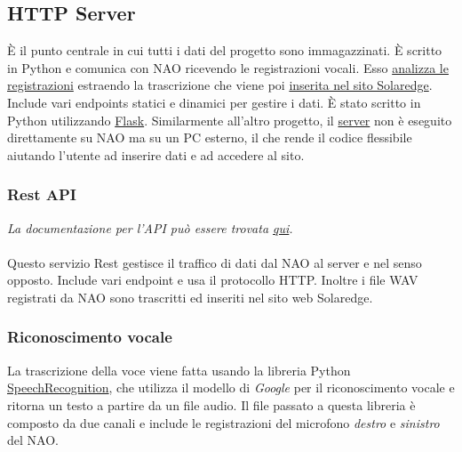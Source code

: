 \documentclass{optica-article}
\begin{document}
\vspace{12pt}
\subsection{HTTP Server}\label{sec:solaedge_server}
È il punto centrale in cui tutti i dati del progetto sono immagazzinati. È scritto in Python e comunica con NAO ricevendo le registrazioni vocali. Esso \hyperref[sec:solaredge_voice_recognition]{analizza le registrazioni} estraendo la trascrizione che viene poi \hyperref[sec:solaredge_website_control]{inserita nel sito Solaredge}. Include vari endpoints statici e dinamici per gestire i dati. È stato scritto in Python utilizzando \href{https://flask.palletsprojects.com/en/2.2.x/}{Flask}. Similarmente all'altro progetto, il \hyperref[sec:solaedge_server]{server} non è eseguito direttamente su NAO ma su un PC esterno, il che rende il codice flessibile aiutando l'utente ad inserire dati e ad accedere al sito.

\vspace{8pt}
\subsubsection{Rest API}\label{sec:solaredge_rest_api}
\textit{La documentazione per l'API può essere trovata \href{https://naonexus.notion.site/Solaredge-server-1bae2ae87b4d407b82f5a50bbfe3d87c}{qui}.}\\
\\Questo servizio Rest gestisce il traffico di dati dal NAO al server e nel senso opposto. Include vari endpoint e usa il protocollo HTTP. Inoltre i file WAV registrati da NAO sono trascritti ed inseriti nel sito web Solaredge.

\vspace{8pt}
\subsubsection{Riconoscimento vocale}\label{sec:solaredge_voice_recognition}
La trascrizione della voce viene fatta usando la libreria Python \href{https://pypi.org/project/SpeechRecognition/}{SpeechRecognition}, che utilizza il modello di \emph{Google} per il riconoscimento vocale e ritorna un testo a partire da un file audio. Il file passato a questa libreria è composto da due canali e include le registrazioni del microfono \emph{destro} e \emph{sinistro} del NAO.

\vspace{8pt}
\end{document}
